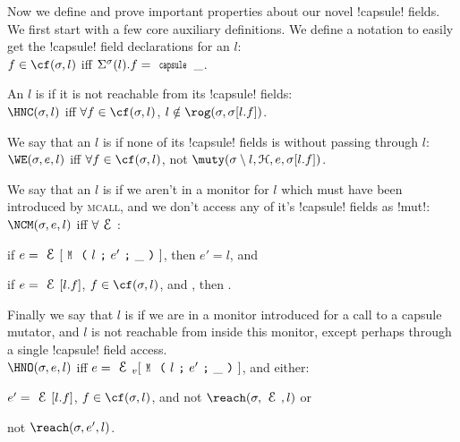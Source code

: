 



Now we define and prove important properties about our novel \Q!capsule! fields. We first start with a few core auxiliary definitions. We define a notation to easily get the \Q!capsule! field declarations for an $l$:\\
\indent $f \in \cf(\s, l)$ iff $\Ss(l).f = \Kw{capsule}\,\_$.

\noindent An $l$ is \HNC if it is not reachable from its \Q!capsule! fields:\\
\indent $\HNC(\s, l)$ iff $\forall f \in \cf(\s, l)$, $l \notin \rog(\s, \s[l.f])$.

\noindent We say that an $l$ is \WE if none of its \Q!capsule! fields is \muty without passing through $l$:\\
\indent $\WE(\s, e, l)$ iff $\forall f \in \cf(\s, l)$, not $\muty(\s\setminus l, \h, e, \s[l.f])$.

\noindent We say that an $l$ is \NCM if we aren't in a monitor for $l$ which must have been introduced by \textsc{mcall}, and we don't access any of it's \Q!capsule! fields as \Q!mut!:\\
\indent $\NCM(\s, e, l)$ iff $\forall \E$:
\begin{iitemize}
\item if $e = \E[\M{l}{e'}{\_}]$, then $e' = l$, and
\item if $e = \E[l.f]$, $f \in \cf(\s, l)$, and , then .
\end{iitemize}

\noindent Finally we say that $l$ is \HNO if we are in a monitor introduced for a call to a capsule mutator, and $l$ is not reachable from inside this monitor, except perhaps through a single \Q!capsule! field access.\\
\indent $\HNO(\s, e, l)$ iff $e = \EV[\M{l}{e'}{\_}]$, and either:
\begin{iitemize}
\item $e' = \E[l.f]$, $f \in \cf(\s, l)$, and not $\reach(\s, \E, l)$ or
\item not $\reach(\s, e', l)$.
\end{iitemize}

